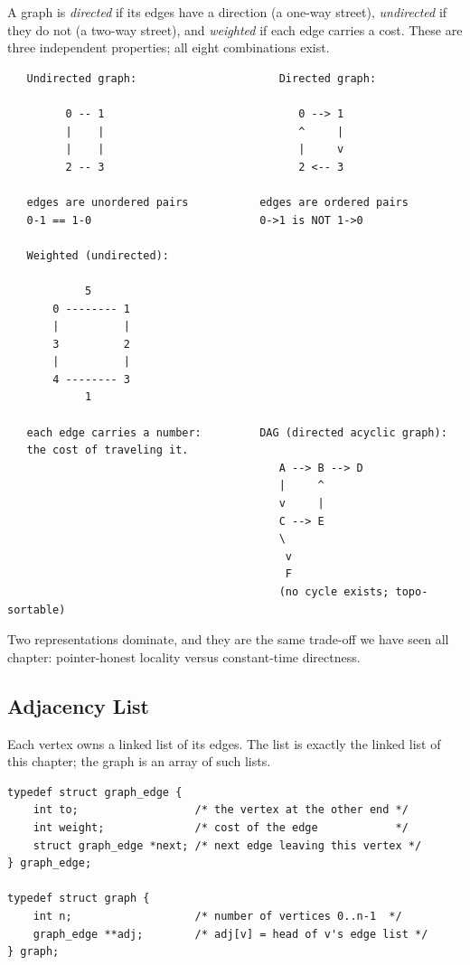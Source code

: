 A graph is \emph{directed} if its edges have a direction (a one-way
street), \emph{undirected} if they do not (a two-way street), and
\emph{weighted} if each edge carries a cost. These are three
independent properties; all eight combinations exist.

\begin{verbatim}
   Undirected graph:                      Directed graph:

         0 -- 1                              0 --> 1
         |    |                              ^     |
         |    |                              |     v
         2 -- 3                              2 <-- 3

   edges are unordered pairs           edges are ordered pairs
   0-1 == 1-0                          0->1 is NOT 1->0

   Weighted (undirected):

            5
       0 -------- 1
       |          |
       3          2
       |          |
       4 -------- 3
            1

   each edge carries a number:         DAG (directed acyclic graph):
   the cost of traveling it.
                                          A --> B --> D
                                          |     ^
                                          v     |
                                          C --> E
                                          \
                                           v
                                           F
                                          (no cycle exists; topo-sortable)
\end{verbatim}

Two representations dominate, and they are the same trade-off we have
seen all chapter: pointer-honest locality versus constant-time
directness.

\subsection{Adjacency List}

Each vertex owns a linked list of its edges. The list is exactly the
linked list of this chapter; the graph is an array of such lists.

\begin{lstlisting}[caption={Adjacency list representation.}]
typedef struct graph_edge {
    int to;                  /* the vertex at the other end */
    int weight;              /* cost of the edge            */
    struct graph_edge *next; /* next edge leaving this vertex */
} graph_edge;

typedef struct graph {
    int n;                   /* number of vertices 0..n-1  */
    graph_edge **adj;        /* adj[v] = head of v's edge list */
} graph;
\end{lstlisting}

